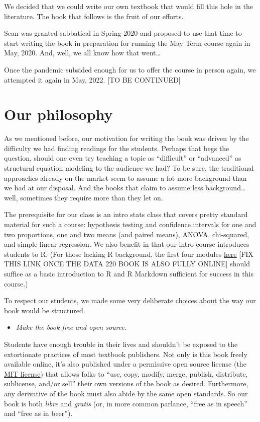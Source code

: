 \documentclass[
]{book}
\providecommand{\tightlist}{%
  \setlength{\itemsep}{0pt}\setlength{\parskip}{0pt}}
\begin{document}
We decided that we could write our own textbook that would fill this hole in the literature. The book that follows is the fruit of our efforts.

Sean was granted sabbatical in Spring 2020 and proposed to use that time to start writing the book in preparation for running the May Term course again in May, 2020. And, well, we all know how that went\ldots{}

Once the pandemic subsided enough for us to offer the course in person again, we attempted it again in May, 2022. {[}TO BE CONTINUED{]}

\hypertarget{intro-philosophy}{%
\section*{Our philosophy}\label{intro-philosophy}}

As we mentioned before, our motivation for writing the book was driven by the difficulty we had finding readings for the students. Perhaps that begs the question, should one even try teaching a topic as ``difficult'' or ``advanced'' as structural equation modeling to the audience we had? To be sure, the traditional approaches already on the market seem to assume a lot more background than we had at our disposal. And the books that claim to assume less background\ldots well, sometimes they require more than they let on.

The prerequisite for our class is an intro stats class that covers pretty standard material for such a course: hypothesis testing and confidence intervals for one and two proportions, one and two means (and paired means), ANOVA, chi-squared, and simple linear regression. We also benefit in that our intro course introduces students to R. (For those lacking R background, the first four modules \href{https://github.com/VectorPosse/Intro_Stats}{here} {[}FIX THIS LINK ONCE THE DATA 220 BOOK IS ALSO FULLY ONLINE{]} should suffice as a basic introduction to R and R Markdown sufficient for success in this course.)

To respect our students, we made some very deliberate choices about the way our book would be structured.

\begin{itemize}
\tightlist
\item
  \emph{Make the book free and open source.}
\end{itemize}

Students have enough trouble in their lives and shouldn't be exposed to the extortionate practices of most textbook publishers. Not only is this book freely available online, it's also published under a permissive open source license (the \href{https://opensource.org/licenses/MIT}{MIT license}) that allows folks to ``use, copy, modify, merge, publish, distribute, sublicense, and/or sell'' their own versions of the book as desired. Furthermore, any derivative of the book must also abide by the same open standards. So our book is both \emph{libre} and \emph{gratis} (or, in more common parlance, ``free as in speech'' and ``free as in beer'').
\end{document}
